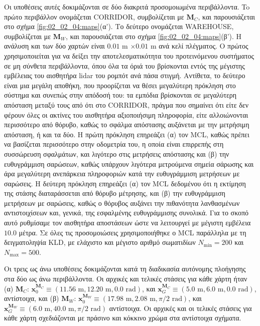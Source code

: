Οι υποθέσεις αυτές δοκιμάζονται σε δύο διακριτά προσομοιωμένα περιβάλλοντα. To
πρώτο περιβάλλον ονομάζεται CORRIDOR, συμβολίζεται με $\bm{M}_C$, και
παρουσιάζεται στο σχήμα \ref{fig:02_02_04:maps}(α'). Το δεύτερο ονομάζεται
WAREHOUSE, συμβολίζεται με $\bm{M}_W$, και παρουσιάζεται στο σχήμα
\ref{fig:02_02_04:maps}(β'). Η ανάλυση και των δύο χαρτών είναι $0.01$ m
$\times0.01$ m ανά κελί πλέγματος. Ο πρώτος χρησιμοποιείται για να δείξει την
αποτελεσματικότητα του προτεινόμενου συστήματος σε μη σύνθετα περιβάλλοντα,
όπου όλα τα όριά του βρίσκονται εντός της μέγιστης εμβέλειας του αισθητήρα
lidar του ρομπότ ανά πάσα στιγμή.  Αντίθετα, το δεύτερο είναι μια μεγάλη
αποθήκη, που προορίζεται να θέσει μεγαλύτερη πρόκληση στο σύστημα και συνεπώς
στην απόδοσή του: τα εμπόδια βρίσκονται σε μεγαλύτερη απόσταση μεταξύ τους από
ότι στο CORRIDOR, πράγμα που σημαίνει ότι είτε δεν φέρουν όλες οι ακτίνες του
αισθητήρα αξιοποιήσιμη πληροφορία, είτε αλλοιώνονται περισσότερο από θόρυβο,
καθώς το σφάλμα απόστασης αυξάνεται με την μετρήσιμη απόσταση, ή και τα δύο. Η
πρώτη πρόκληση επηρεάζει (α) τον MCL, καθώς πρέπει να βασίζεται περισσότερο
στην οδομετρία του, η οποία είναι επιρρεπής στη συσσώρευση σφαλμάτων, και
λιγότερο στις μετρήσεις απόστασης και (β) την ευθυγράμμιση σαρώσεων, καθώς
υπάρχουν λιγότερα μετρούμενα σημεία σάρωσης και άρα μεγαλύτερη ανεπάρκεια
πληροφοριών κατά την ευθυγράμμιση μετρήσεων με σαρώσεις. Η δεύτερη πρόκληση
επηρεάζει (α) τον MCL δεδομένου ότι η εκτίμηση της στάσης διαταράσσεται από
θόρυβο μέτρησης, και (β) την ευθυγράμμιση μετρήσεων με σαρώσεις, καθώς ο
θόρυβος αυξάνει την πιθανότητα λανθασμένων αντιστοιχίσεων και, γενικά, της
εσφαλμένης ευθυγράμμισης συνολικά. Για το σκοπό αυτό ρυθμίσαμε τον αισθητήρα
αποστάσεων ώστε να λειτουργεί με μέγιστη εμβέλεια $10.0$ μέτρα.  Σε όλες τις
προσομοιώσεις χρησιμοποιήθηκε ο MCL παράλληλα με τη δειγματοληψία KLD, με
ελάχιστο και μέγιστο αριθμό σωματιδίων $N_{\min}=200$ και $N_{\max}=500$.

Οι τρεις ως άνω υποθέσεις δοκιμάζονται κατά τη διαδικασία αυτόνομης πλοήγησης
στα δύο ως άνω περιβάλλοντα. Οι αρχικές και τελικές στάσεις για κάθε χάρτη ήταν
(α) $\bm{M}_C$:
$\bm{x}_0^{\bm{M}_C} \equiv (11.56\text{ m}, 12.20\text{ m}, 0.0 \text{ rad})$,
και $\bm{x}_G^{\bm{M}_C} \equiv (5.0 \text{ m}, 6.0 \text{ m}, 0.0 \text{ rad})$,
αντίστοιχα, και
(β) $\bm{M}_W$:
$\bm{x}_0^{\bm{M}_W} \equiv (17.98 \text{ m}, 2.08 \text{ m}, \pi/2 \text{ rad})$,
και $\bm{x}_G^{\bm{M}_W} \equiv (6.0 \text{ m}, 40.0 \text{ m}, \pi/2 \text{ rad})$
αντίστοιχα. Οι αρχικές και οι τελικές στάσεις για κάθε χάρτη σχεδιάζονται με
πράσινο και κόκκινο χρώμα στα αντίστοιχα σχήματα.


